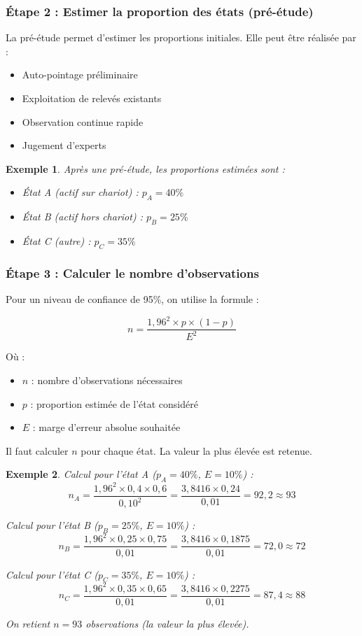\documentclass[a4paper,12pt]{article}
\newtheorem{exemple}{Exemple}[section]
\begin{document}
\subsubsection{Étape 2 : Estimer la proportion des états (pré-étude)}

La pré-étude permet d'estimer les proportions initiales. Elle peut être réalisée par :
\begin{itemize}
    \item Auto-pointage préliminaire
    \item Exploitation de relevés existants
    \item Observation continue rapide
    \item Jugement d'experts
\end{itemize}

\begin{exemple}
Après une pré-étude, les proportions estimées sont :
\begin{itemize}
    \item État A (actif sur chariot) : $p_A = 40\%$
    \item État B (actif hors chariot) : $p_B = 25\%$
    \item État C (autre) : $p_C = 35\%$
\end{itemize}
\end{exemple}

\subsubsection{Étape 3 : Calculer le nombre d'observations}

Pour un niveau de confiance de 95\%, on utilise la formule :

\[
n = \frac{1,96^2 \times p \times (1-p)}{E^2}
\]

Où :
\begin{itemize}
    \item $n$ : nombre d'observations nécessaires
    \item $p$ : proportion estimée de l'état considéré
    \item $E$ : marge d'erreur absolue souhaitée
\end{itemize}

Il faut calculer $n$ pour chaque état. La valeur la plus élevée est retenue.

\begin{exemple}
Calcul pour l'état A ($p_A = 40\%$, $E = 10\%$) :
\[
n_A = \frac{1,96^2 \times 0,4 \times 0,6}{0,10^2} = \frac{3,8416 \times 0,24}{0,01} = 92,2 \approx 93
\]

Calcul pour l'état B ($p_B = 25\%$, $E = 10\%$) :
\[
n_B = \frac{1,96^2 \times 0,25 \times 0,75}{0,01} = \frac{3,8416 \times 0,1875}{0,01} = 72,0 \approx 72
\]

Calcul pour l'état C ($p_C = 35\%$, $E = 10\%$) :
\[
n_C = \frac{1,96^2 \times 0,35 \times 0,65}{0,01} = \frac{3,8416 \times 0,2275}{0,01} = 87,4 \approx 88
\]

On retient $n = 93$ observations (la valeur la plus élevée).
\end{exemple}
\end{document}
